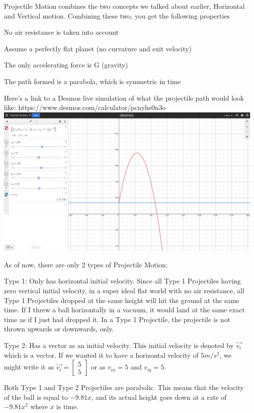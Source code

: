 \documentclass[12pt, letterpaper]{article}
\begin{document}
\noindent Projectile Motion combines the two concepts we talked about earlier, Horizontal and Vertical motion. Combining these two, you get the following properties

\begin{boxlabel}
    \item No air resistance is taken into account
    \item Assume a perfectly flat planet (no curvature and exit velocity)
    \item The only accelerating force is G (gravity)
    \item The path formed is a parabola, which is symmetric in time
    \item Here's a link to a Desmos live simulation of what the projectile path would look like: https://www.desmos.com/calculator/pcnyhs0n3o
    \includegraphics[width=\textwidth * \real{0.9}]{Graphs/desmos-example1.png}
\end{boxlabel}

\newpage
\noindent As of now, there are only 2 types of Projectile Motion:

\begin{boxlabel}
    \item Type 1: Only has horizontal initial velocity. Since all Type 1 Projectiles having zero vertical initial velocity, in a super ideal flat world with no air resistance, all Type 1 Projectiles dropped at the same height will hit the ground at the same time. If I threw a ball horizontally in a vacuum, it would land at the same exact time as if I just had dropped it. In a Type 1 Projectile, the projectile is not thrown upwards or downwards, only.
    \item Type 2: Has a vector as an initial velocity. This initial velocity is denoted by $\vec{v_i}$ which is a vector. If we wanted it to have a horizontal velocity of $5m/s^2$, we might write it as $\vec{v_i}=\begin{bmatrix}
        5\\5
    \end{bmatrix}$ or as $v_{ix}=5$ and $v_{iy}=5$.
    \item Both Type 1 and Type 2 Projectiles are parabolic. This means that the velocity of the ball is equal to $-9.81x$, and its actual height goes down at a rate of $-9.81x^2$ where $x$ is time.
\end{boxlabel}
\newpage
\end{document}
